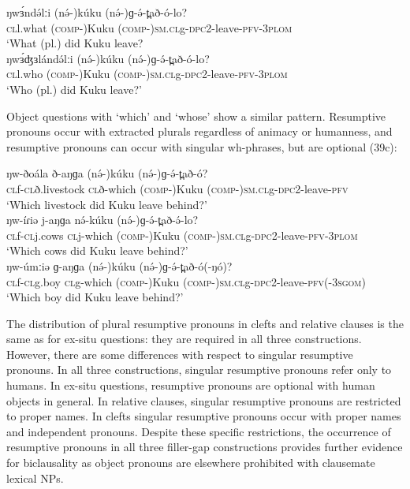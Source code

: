 \ea
\ea \gll	ŋwɜ́ndə́lːi	(nə́-)kúku	(nə́-)ɡ-ə́-t̪að-ó-lo?\\
	\textsc{cl}l.what	(\textsc{comp-})Kuku	(\textsc{comp-})\textsc{sm.cl}g-\textsc{dpc}2-leave-\textsc{pfv}-3\textsc{plom}\\
\trans		‘What (pl.) did Kuku leave?			 \\
\ex \gll	ŋwɜ́ʤɜlándə́lːi	(nə́-)kúku	(nə́-)ɡ-ə́-t̪að-ó-lo?\\
	\textsc{cl}l.who	(\textsc{comp-})Kuku  (\textsc{comp-})\textsc{sm.cl}g-\textsc{dpc}2-leave-\textsc{pfv}-3\textsc{plom}\\
\trans		‘Who (pl.) did Kuku leave?’	\\
\z
\z

Object questions with ‘which’ and ‘whose’ show a similar pattern.  Resumptive pronouns occur with extracted plurals regardless of animacy or humanness, and resumptive pronouns can occur with singular wh-phrases, but are optional (39c): 

\ea
\ea \gll	ŋw-ðoála	ð-aŋɡa	(nə́-)kúku	(nə́-)ɡ-ə́-t̪að-ó?\\
		\textsc{cl}f-\textsc{cl}ð.livestock	\textsc{cl}ð-which	(\textsc{comp-})Kuku	(\textsc{comp-})\textsc{sm.cl}g-\textsc{dpc}2-leave-\textsc{pfv}\\
\trans		 ‘Which livestock did Kuku leave behind?’\\
\ex \gll	ŋw-íɾiə	j-aŋɡa	nə́-kúku	(nə́-)ɡ-ə́-t̪að-ə́-lo?	\\
		\textsc{cl}f-\textsc{cl}j.cows	\textsc{cl}j-which	(\textsc{comp-})Kuku	(\textsc{comp-})\textsc{sm.cl}g-\textsc{dpc}2-leave-\textsc{pfv}-3\textsc{plom}\\
\trans		‘Which cows did Kuku leave behind?’\\
\ex \gll	ŋw-úmːiə	ɡ-aŋɡa	(nə́-)kúku	(nə́-)ɡ-ə́-t̪að-ó(-ŋó)?\\
		\textsc{cl}f-\textsc{cl}g.boy	\textsc{cl}g-which	(\textsc{comp-})Kuku	(\textsc{comp-})\textsc{sm.cl}g-\textsc{dpc}2-leave-\textsc{pfv}(-3\textsc{sgom})\\
\trans		‘Which boy did Kuku leave behind?’\\
\z
\z

The distribution of plural resumptive pronouns in clefts and relative clauses is the same as for ex-situ questions: they are required in all three constructions. However, there are some differences with respect to singular resumptive pronouns. In all three constructions, singular resumptive pronouns refer only to humans. In ex-situ questions, resumptive pronouns are optional with human objects in general. In relative clauses, singular resumptive pronouns are restricted to proper names. In clefts singular resumptive pronouns occur with proper names and independent pronouns. Despite these specific restrictions, the occurrence of resumptive pronouns in all three filler-gap constructions provides further evidence for biclausality as object pronouns are elsewhere prohibited with clausemate lexical NPs.

